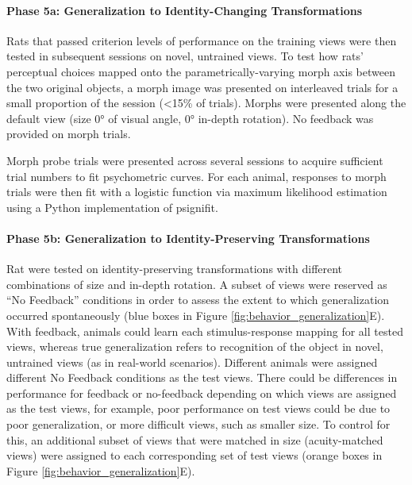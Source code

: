 \paragraph{Phase 5a:  Generalization to Identity-Changing Transformations}
Rats that passed criterion levels of performance on the training views were then tested in subsequent sessions on novel, untrained views. To test how rats' perceptual choices mapped onto the parametrically-varying morph axis between the two original objects, a morph image was presented on interleaved trials for a small proportion of the session (<15\% of trials). Morphs were presented along the default view (size \ang{0} of visual angle, \ang{0} in-depth rotation). No feedback was provided on morph trials.

Morph probe trials were presented across several sessions to acquire sufficient trial numbers to fit psychometric curves. For each animal, responses to morph trials were then fit with a logistic function via  maximum likelihood estimation\cite{Virtanen2020} using a Python implementation of psignifit\cite{Schutt2016, Wichmann2001a}.

\paragraph{Phase 5b:  Generalization to Identity-Preserving Transformations}
Rat were tested on identity-preserving transformations with different combinations of size and in-depth rotation. A subset of views were reserved as ``No Feedback'' conditions in order to assess the extent to which generalization occurred spontaneously (blue boxes in Figure \ref{fig:behavior_generalization}E). With feedback, animals could learn each stimulus-response mapping for all tested views, whereas true generalization refers to recognition of the object in novel, untrained views (as in real-world scenarios). Different animals were assigned different No Feedback conditions as the test views. There could be differences in performance for feedback or no-feedback depending on which views are assigned as the test views, for example, poor performance on test views could be due to poor generalization, or more difficult views, such as smaller size. To control for this, an additional subset of views that were matched in size (acuity-matched views) were assigned to each corresponding set of test views (orange boxes in Figure \ref{fig:behavior_generalization}E).
 
